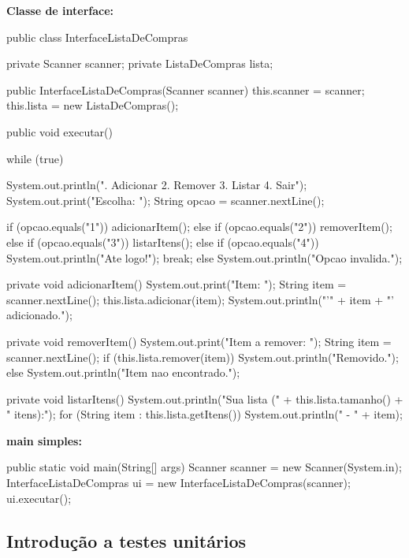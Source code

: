 \documentclass[11pt,a4paper]{article}
\renewcommand{\texttt}[1]{{\color{javaCodeInline}\small\ttfamily #1}}
\begin{document}
\textbf{Classe de interface:}

\begin{javacode}
public class InterfaceListaDeCompras {
    private Scanner scanner;
    private ListaDeCompras lista;

    public InterfaceListaDeCompras(Scanner scanner) {
        this.scanner = scanner;
        this.lista = new ListaDeCompras();
    }

    public void executar() {
        while (true) {
            System.out.println(". Adicionar  2. Remover  3. Listar  4. Sair");
            System.out.print("Escolha: ");
            String opcao = scanner.nextLine();

            if (opcao.equals("1")) {
                adicionarItem();
            } else if (opcao.equals("2")) {
                removerItem();
            } else if (opcao.equals("3")) {
                listarItens();
            } else if (opcao.equals("4")) {
                System.out.println("Ate logo!");
                break;
            } else {
                System.out.println("Opcao invalida.");
            }
        }
    }

    private void adicionarItem() {
        System.out.print("Item: ");
        String item = scanner.nextLine();
        this.lista.adicionar(item);
        System.out.println("'" + item + "' adicionado.");
    }

    private void removerItem() {
        System.out.print("Item a remover: ");
        String item = scanner.nextLine();
        if (this.lista.remover(item)) {
            System.out.println("Removido.");
        } else {
            System.out.println("Item nao encontrado.");
        }
    }

    private void listarItens() {
        System.out.println("Sua lista (" + this.lista.tamanho() + " itens):");
        for (String item : this.lista.getItens()) {
            System.out.println("  - " + item);
        }
    }
}
\end{javacode}

\textbf{\texttt{main} simples:}

\begin{javacode}
public static void main(String[] args) {
    Scanner scanner = new Scanner(System.in);
    InterfaceListaDeCompras ui = new InterfaceListaDeCompras(scanner);
    ui.executar();
}
\end{javacode}

\subsection{Introdução a testes unitários}
\end{document}
